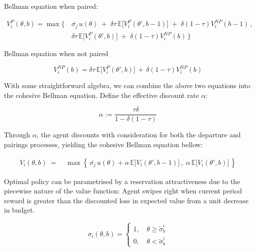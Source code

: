 Bellman equation when paired:

\begin{equation}
    \begin{split}
    V^{P}_i(\theta,b) = \max \Big\{\, & \overline{\sigma_j}\, u(\theta) \;+\; \delta \tau \,\mathbb{E}\Big[V^P_i(\theta', b-1)\Big] \;+\; \delta (1-\tau)V^{NP}_i(b-1)\,,\\  & \delta \tau \,\mathbb{E}\Big[ V^P_i(\theta', b)\Big] \;+\; \delta (1-\tau) V^{NP}_i(b)\, \Big\}  
    \end{split}
\end{equation}

Bellman equation when not paired

\begin{equation} 
        V^{NP}_i(b) = \delta \tau \,\mathbb{E}\Big[ V^P_i(\theta', b)\Big] \,+\, \delta (1-\tau) V^{NP}_i(b) 
\end{equation}

With some straightforward algebra, we can combine the above two equations into the cohesive Bellman equation. Define the effective discount rate $\alpha$: 

$$
\alpha:=\frac{\tau\delta}{1-\delta(1-\tau)}
$$

Through $\alpha$, the agent discounts with consideration for both the departure and pairings processes, yielding the cohesive Bellman equation bellow:

\begin{equation}
    \begin{aligned} 
        V_i(\theta,b) \;=\;&\max\left\{\,\overline{\sigma_j} \, u(\theta) +\alpha \,\mathbb{E}\Big[V_i(\theta', b-1)\Big]\,,\; \alpha\,\mathbb{E}\Big[ V_i(\theta', b)\Big]\,\right\} 
    \end{aligned}
\end{equation}

Optimal policy can be parametrised by a reservation attractiveness due to the piecewise nature of the value function: Agent swipes right when current period reward is greater than the discounted loss in expected value from a unit decrease in budget.

\begin{equation}
    \sigma_i(\theta,b)=\begin{cases}
        1,\quad \theta\geq \widetilde{\sigma}^i_b \\ 
        0, \quad\theta< \widetilde\sigma^i_b  
    \end{cases}
\end{equation}

